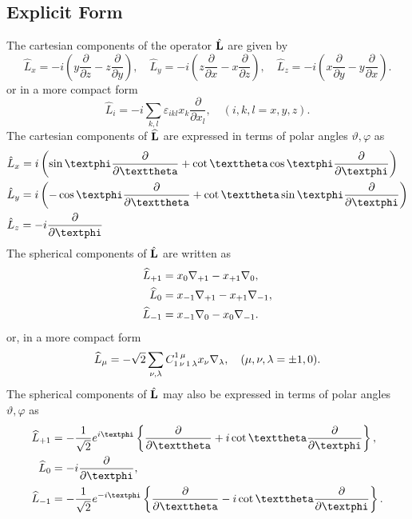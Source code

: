 \subsection{Explicit Form}\label{sec:2.2.3}
The cartesian components of the operator $\hat{\mathbf{L}}$ are given by
\begin{equation}
\hat{L}_{x}=-i\left(y \frac{\partial}{\partial z}-z \frac{\partial}{\partial y}\right), \quad \hat{L}_{y}=-i\left(z \frac{\partial}{\partial x}-x \frac{\partial}{\partial z}\right), \quad \hat{L}_{z}=-i\left(x \frac{\partial}{\partial y}-y \frac{\partial}{\partial x}\right) . \label{eq:2:2:13}
\end{equation}
or in a more compact form
\begin{equation}
\hat{L}_{i}=-i \sum_{k, l} \varepsilon_{i k l} x_{k} \frac{\partial}{\partial x_{l}}, \quad(i, k, l=x, y, z) .\label{eq:2:2:14}
\end{equation}
The cartesian components of $\widehat{\mathbf{L}}$ are expressed in terms of polar angles $\vartheta, \varphi$ as
\begin{align}
& \hat{L}_{x}=i\left(\sin \varphi \frac{\partial}{\partial \vartheta}+\cot \vartheta \cos \varphi \frac{\partial}{\partial \varphi}\right)  \notag\\
& \hat{L}_{y}=i\left(-\cos \varphi \frac{\partial}{\partial \vartheta}+\cot \vartheta \sin \varphi \frac{\partial}{\partial \varphi}\right)  \label{eq:2:2:15}\\
& \hat{L}_{z}=-i \frac{\partial}{\partial \varphi} \notag
\end{align}
The spherical components of $\hat{\mathbf{L}}$ are written as
\begin{align}
\widehat{L}_{+1} & =x_{0} \nabla_{+1}-x_{+1} \nabla_{0} , \notag\\
\widehat{L}_{0} & =x_{-1} \nabla_{+1}-x_{+1} \nabla_{-1} , \label{eq:2:2:16}\\
\widehat{L}_{-1} & =x_{-1} \nabla_{0}-x_{0} \nabla_{-1} .\notag
\end{align}
or, in a more compact form
\begin{equation}
\widehat{L}_{\mu}=-\sqrt{2} \sum_{\nu, \lambda} C_{1\,\nu\,1\,\lambda}^{1\,\mu} x_{\nu} \nabla_{\lambda}, \quad(\mu, \nu, \lambda= \pm 1,0). \label{eq:2:2:17}
\end{equation}
The spherical components of $\hat{\mathbf{L}}$ may also be expressed in terms of polar angles $\vartheta, \varphi$ as
\begin{align}
\widehat{L}_{+1} & =-\frac{1}{\sqrt{2}} e^{i \varphi}\left\{\frac{\partial}{\partial \vartheta}+i \cot \vartheta \frac{\partial}{\partial \varphi}\right\}  ,\notag\\
\widehat{L}_{0} & =-i \frac{\partial}{\partial \varphi} , \label{eq:2:2:18}\\
\widehat{L}_{-1} & =-\frac{1}{\sqrt{2}} e^{-i \varphi}\left\{\frac{\partial}{\partial \vartheta}-i \cot \vartheta \frac{\partial}{\partial \varphi}\right\} . \notag
\end{align}
